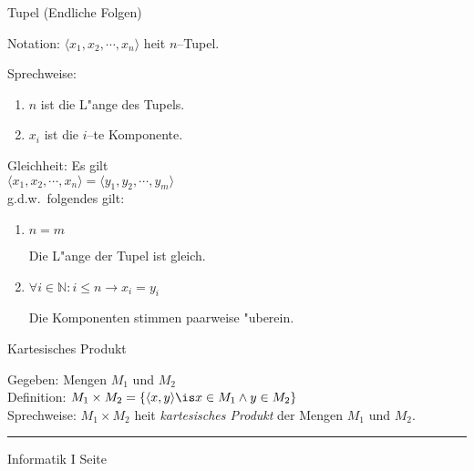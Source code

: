 
\begin{slide}{}
\normalsize
\begin{center}
Tupel (Endliche Folgen)
\end{center}
\vspace{0.5cm}

\footnotesize
Notation: $\langle x_1, x_2, \cdots, x_n \rangle$ hei\3t $n$--Tupel.

Sprechweise:
\begin{enumerate}
\item $n$ ist die L"ange des Tupels.
\item $x_i$ ist die $i$--te Komponente.
\end{enumerate}

Gleichheit: Es gilt \\[0.3cm]
\hspace*{1.3cm} $\langle x_1, x_2, \cdots, x_n \rangle = \langle y_1, y_2, \cdots, y_m \rangle$ \\[0.3cm]
g.d.w.~folgendes gilt:
\begin{enumerate}
\item $n = m$

      Die L"ange der Tupel ist gleich.
\item $\forall i \in \mathbb{N}: i \leq n \rightarrow x_i = y_i$

      Die Komponenten stimmen paarweise "uberein.
\end{enumerate}

\normalsize
\begin{center}
  Kartesisches Produkt
\end{center}

\footnotesize
Gegeben:    Mengen $M_1$ und $M_2$ \\[0.3cm]
Definition: $M_1 \times M_2 = \{ \langle x, y \rangle \is x \in M_1 \wedge y \in M_2 \}$ \\[0.3cm]
Sprechweise: $M_1 \times M_2$ hei\3t {\em kartesisches Produkt} der Mengen $M_1$ und $M_2$.

\vspace*{\fill}
\tiny \addtocounter{mypage}{1}
\rule{15cm}{1mm}
Informatik I  \hspace*{\fill} Seite 
\end{slide}


